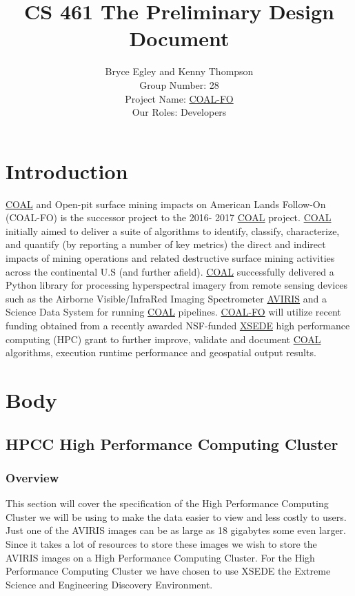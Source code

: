 \documentclass[10pt,draftclsnofoot,onecolumn,journal,compsoc]{IEEEtran}
\title{CS 461 The Preliminary Design Document}
\author{Bryce Egley and Kenny Thompson \\ Group Number: 28 \\ Project Name: \href{http://eecs.oregonstate.edu/capstone/submission/?page=preview\&pid=320}{COAL-FO} \\ Our Roles: Developers}
\date{}
\begin{document}
\maketitle
\newpage

\tableofcontents

\newpage

\section{Introduction}
	\href{https://capstone-coal.github.io/}{COAL} and Open-pit surface mining impacts on American Lands Follow-On (COAL-FO) is the successor project to the 2016-
2017 \href{https://capstone-coal.github.io/}{COAL} project. \href{https://capstone-coal.github.io/}{COAL} initially aimed to deliver a suite of algorithms to identify, classify, characterize, and quantify (by reporting a
number of key metrics) the direct and indirect impacts of mining operations and related destructive surface mining activities across the
continental U.S (and further afield). \href{https://capstone-coal.github.io/}{COAL} successfully delivered a Python library for processing hyperspectral imagery from remote
sensing devices such as the Airborne Visible/InfraRed Imaging Spectrometer \href{https://aviris.jpl.nasa.gov/}{AVIRIS} and a Science Data System for running \href{https://capstone-coal.github.io/}{COAL}
pipelines. \href{http://eecs.oregonstate.edu/capstone/cs/capstone.cgi?project=320}{COAL-FO} will utilize recent funding obtained from a recently awarded NSF-funded \href{https://www.xsede.org/}{XSEDE} high performance computing
(HPC) grant to further improve, validate and document \href{https://capstone-coal.github.io/}{COAL} algorithms, execution runtime performance and geospatial output
results.\cite{1}

\section{Body}

\subsection{HPCC High Performance Computing Cluster}

\subsubsection{Overview}

\noindent This section will cover the specification of the High Performance Computing Cluster we will be using to make the data easier to view and less costly to users. Just one of the AVIRIS images can be as large as 18 gigabytes some even larger. Since it takes a lot of resources to store these images we wish to store the AVIRIS images on a High Performance Computing Cluster. For the High Performance Computing Cluster we have chosen to use XSEDE the Extreme Science and Engineering Discovery Environment.
\end{document}
